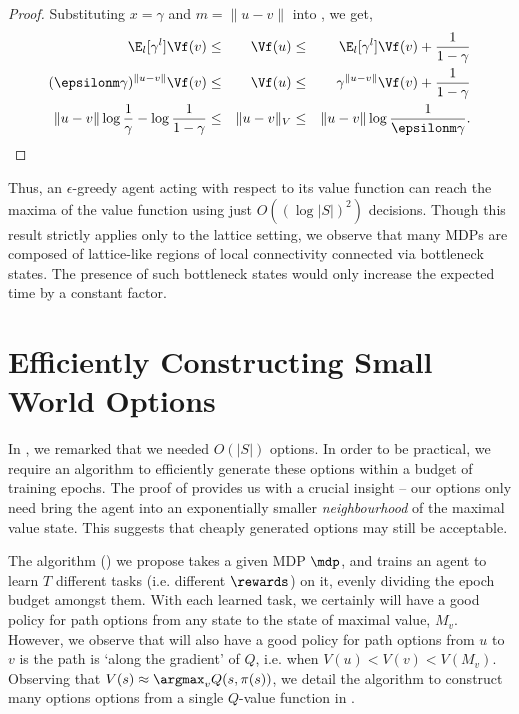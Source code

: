 \begin{proof}
    Substituting $x = \gamma$ and $m = \|u - v\|$ into
    , we get,
    \begin{align*}
        \E_{l}[ \gamma^{l} ] \Vf(v) &\le& \Vf(u) &\le& \E_{l}[ \gamma^{l} ] \Vf(v) + \frac{1}{1 - \gamma} \\
        (\epsilonm \gamma)^{\|u-v\|} \Vf(v) &\le& \Vf(u) &\le& \gamma^{\|u-v\|} \Vf(v) + \frac{1}{1 - \gamma} \\
        \|u-v\| \log \frac{1}{\gamma} - \log \frac{1}{1-\gamma} &\le& \|u - v\|_V &\le& \|u-v\| \log \frac{1}{\epsilonm \gamma}.
    \end{align*}
\end{proof}

Thus, an $\epsilon$-greedy agent acting with respect to its value
function can reach the maxima of the value function using just $O((\log
|S|)^2)$ decisions. Though this result strictly applies only to the
lattice setting, we observe that many MDPs are composed of lattice-like
regions of local connectivity connected via bottleneck states. The
presence of such bottleneck states would only increase the expected time
by a constant factor. 

\section{Efficiently Constructing Small World Options}
\label{sec:sw:algo}

In , we remarked that we needed $O(|S|)$ options.
In order to be practical, we require an algorithm to efficiently
generate these options within a budget of training epochs. The proof of
 provides us with a crucial insight -- our options only
need bring the agent into an exponentially smaller {\em neighbourhood}
of the maximal value state. This suggests that cheaply generated options
may still be acceptable.

The algorithm () we propose takes
a given MDP $\mdp$, and trains an agent to learn $T$ different tasks
(i.e. different $\rewards$) on it, evenly dividing the epoch budget
amongst them. With each learned task, we certainly will have a good
policy for path options from any state to the state of maximal value,
$M_v$.  However, we observe that will also have a good policy for path
options from $u$ to $v$ is the path is `along the gradient' of $Q$, i.e.
when $V(u) < V(v) < V(M_v)$. Observing that $V(s) \approx \argmax_{v}
Q(s,\pi(s))$, we detail the algorithm to construct many options options
from a single $Q$-value function in . 

